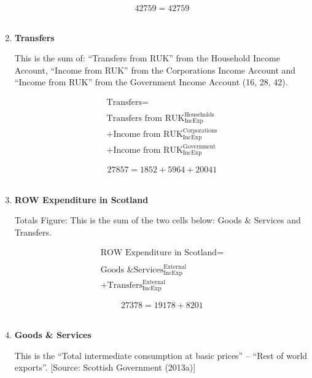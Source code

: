 \begin{enumerate}
\begin{equation} \nonumber
42759 = 42759
\end{equation}\\


\item \textbf {Transfers}

This is the sum of: “Transfers from RUK” from the Household Income Account, “Income from RUK” from the Corporations Income Account and “Income from RUK” from the Government Income Account (16, 28, 42).

\begin{equation}
\begin{split}
\text{Transfers} =  \\ \\
\text{Transfers from RUK}^\text{Households}_\text{IncExp}\\
+\text{Income from RUK}^\text{Corporations}_\text{IncExp}\\
+\text{Income from RUK}^\text{Government}_\text{IncExp}
\end{split} \label{eq:2.5.64}
\end{equation}

\begin{equation} \nonumber
27857 = 1852+5964+20041
\end{equation}\\


\item \textbf {ROW Expenditure in Scotland}

Totals Figure: This is the sum of the two cells below: Goods \& Services and Transfers.

\begin{equation}
\begin{split}
\text{ROW Expenditure in Scotland} =  \\ \\
\text{Goods \& Services}^\text{External}_\text{IncExp}\\
+\text{Transfers}^\text{External}_\text{IncExp}
\end{split} \label{eq:2.5.65}
\end{equation}

\begin{equation} \nonumber
27378 = 19178+8201
\end{equation}\\


\item \textbf {Goods \& Services}

This is the “Total intermediate consumption at basic prices” – “Rest of world exports”. [Source: Scottish Government (2013a)]


\end{enumerate}
